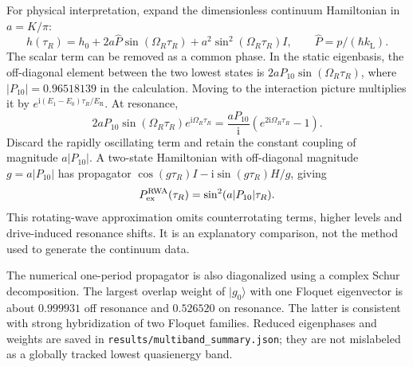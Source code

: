 \documentclass[11pt,oneside]{report}
\numberwithin{equation}{chapter}
\newcommand{\ER}{E_{\mathrm R}}
\newcommand{\ii}{\mathrm i}
\newcommand{\ket}[1]{\lvert #1\rangle}
\begin{document}
For physical interpretation, expand the dimensionless continuum Hamiltonian in $a=K/\pi$:
\begin{equation}
 h(\tau_R)=h_0+2a\hat P\sin(\Omega_R\tau_R)+a^2\sin^2(\Omega_R\tau_R)I,\qquad \hat P=p/(\hbar k_{\mathrm L}).
\end{equation}
The scalar term can be removed as a common phase. In the static eigenbasis, the off-diagonal element between the two lowest states is $2aP_{10}\sin(\Omega_R\tau_R)$, where $|P_{10}|=0.96518139$ in the calculation. Moving to the interaction picture multiplies it by $e^{\ii(E_1-E_0)\tau_R/\ER}$. At resonance,
\begin{equation}
 2aP_{10}\sin(\Omega_R\tau_R)e^{\ii\Omega_R\tau_R}
 =\frac{aP_{10}}{\ii}(e^{2\ii\Omega_R\tau_R}-1).
\end{equation}
Discard the rapidly oscillating term and retain the constant coupling of magnitude $a|P_{10}|$. A two-state Hamiltonian with off-diagonal magnitude $g=a|P_{10}|$ has propagator $\cos(g\tau_R)I-\ii\sin(g\tau_R)H/g$, giving
\begin{equation}\label{eq:RWA}
 P_{\rm ex}^{\rm RWA}(\tau_R)=\sin^2(a|P_{10}|\tau_R).
\end{equation}
This rotating-wave approximation omits counterrotating terms, higher levels and drive-induced resonance shifts. It is an explanatory comparison, not the method used to generate the continuum data.

The numerical one-period propagator is also diagonalized using a complex Schur decomposition. The largest overlap weight of $\ket{g_0}$ with one Floquet eigenvector is about $0.999931$ off resonance and $0.526520$ on resonance. The latter is consistent with strong hybridization of two Floquet families. Reduced eigenphases and weights are saved in \texttt{results/multiband\_summary.json}; they are not mislabeled as a globally tracked lowest quasienergy band.
\end{document}
